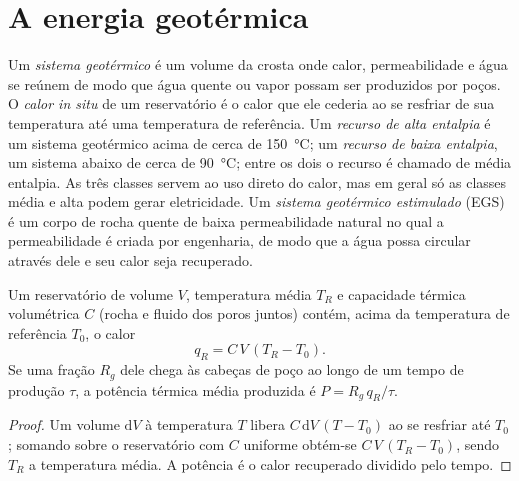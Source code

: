 \section{A energia geotérmica}\label{sec:b2:energy-geology:geothermal}

\begin{definition}\label{def:b2:energy-geology:geothermal}
Um \emph{sistema geotérmico} é um volume da crosta onde calor,
permeabilidade e água se reúnem de modo que água quente ou vapor possam ser produzidos por poços. O
\emph{calor in situ} de um reservatório é o calor que ele cederia ao se resfriar
de sua temperatura até uma temperatura de referência. Um \emph{recurso de alta entalpia}
é um sistema geotérmico acima de cerca de \qty{150}{\celsius}; um \emph{recurso de baixa
entalpia}, um sistema abaixo de cerca de \qty{90}{\celsius}; entre os dois o
recurso é chamado de média entalpia. As três classes servem ao uso direto do calor, mas em geral só as classes média
e alta podem gerar eletricidade. Um \emph{sistema geotérmico estimulado} (EGS) é um corpo de
rocha quente de baixa permeabilidade natural no qual a permeabilidade é criada por engenharia, de modo que a água
possa circular através dele e seu calor seja recuperado.
\end{definition}

\begin{proposition}\label{prop:b2:energy-geology:heat}
Um reservatório de volume $V$, temperatura média $T_R$ e capacidade térmica volumétrica $C$ (rocha e fluido
dos poros juntos) contém, acima da temperatura de referência $T_0$, o calor
\begin{equation}
q_R = C\,V\,(T_R - T_0) .
\label{eq:b2:energy-geology:heat}
\end{equation}
Se uma fração $R_g$ dele chega às cabeças de poço ao longo de um tempo de produção $\tau$, a potência
térmica média produzida é $P = R_g\,q_R/\tau$.
\end{proposition}

\begin{proof}
Um volume $\mathrm{d}V$ à temperatura $T$ libera $C\,\mathrm{d}V\,(T - T_0)$ ao se resfriar até $T_0$;
somando sobre o reservatório com $C$ uniforme obtém-se $C\,V\,(T_R - T_0)$, sendo $T_R$ a temperatura
média. A potência é o calor recuperado dividido pelo tempo.
\end{proof}

